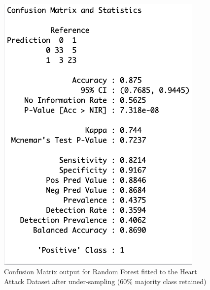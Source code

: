 \begin{figure}[!htbp]
\begin{minipage}{0.45\textwidth}
        \includegraphics[width=0.9\textwidth]{ThesisTemplate/appendix/images/Chapter5Appendix/ConfusionMatrix60/HA.png}
        \caption{Confusion Matrix output for Random Forest fitted to the Heart Attack Dataset after under-sampling (60\% majority class retained)}
        \label{fig:my_label}
    \end{minipage}
\end{figure}

